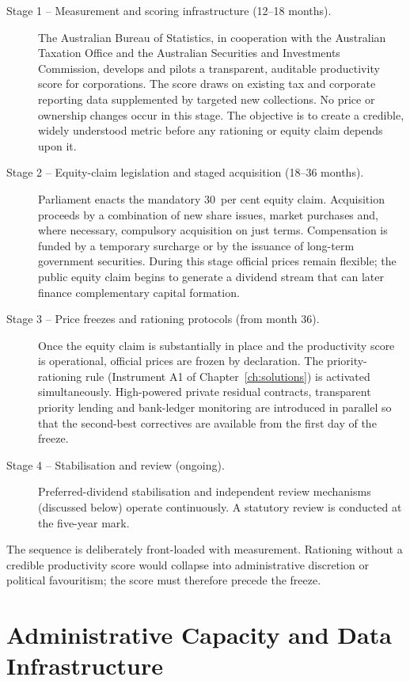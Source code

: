 \documentclass[12pt,anyside]{book}
\theoremstyle{definition}
\theoremstyle{plain}
\theoremstyle{remark}
\begin{document}
\begin{description}
\item[Stage 1 -- Measurement and scoring infrastructure (12--18 months).]  
The Australian Bureau of Statistics, in cooperation with the Australian Taxation Office and the Australian Securities and Investments Commission, develops and pilots a transparent, auditable productivity score for corporations. The score draws on existing tax and corporate reporting data supplemented by targeted new collections. No price or ownership changes occur in this stage. The objective is to create a credible, widely understood metric before any rationing or equity claim depends upon it.

\item[Stage 2 -- Equity-claim legislation and staged acquisition (18--36 months).]  
Parliament enacts the mandatory 30~per cent equity claim. Acquisition proceeds by a combination of new share issues, market purchases and, where necessary, compulsory acquisition on just terms. Compensation is funded by a temporary surcharge or by the issuance of long-term government securities. During this stage official prices remain flexible; the public equity claim begins to generate a dividend stream that can later finance complementary capital formation.

\item[Stage 3 -- Price freezes and rationing protocols (from month 36).]  
Once the equity claim is substantially in place and the productivity score is operational, official prices are frozen by declaration. The priority-rationing rule (Instrument A1 of Chapter~\ref{ch:solutions}) is activated simultaneously. High-powered private residual contracts, transparent priority lending and bank-ledger monitoring are introduced in parallel so that the second-best correctives are available from the first day of the freeze.

\item[Stage 4 -- Stabilisation and review (ongoing).]  
Preferred-dividend stabilisation and independent review mechanisms (discussed below) operate continuously. A statutory review is conducted at the five-year mark.
\end{description}

The sequence is deliberately front-loaded with measurement. Rationing without a credible productivity score would collapse into administrative discretion or political favouritism; the score must therefore precede the freeze.

\section{Administrative Capacity and Data Infrastructure}
\end{document}

